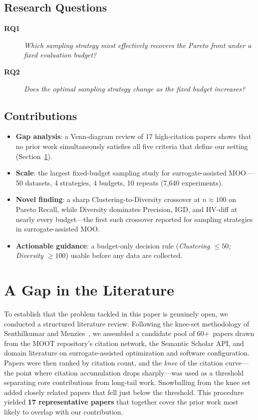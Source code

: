 \documentclass[sigconf,nonacm]{acmart}
\begin{document}
\subsection{Research Questions}

\begin{description}
  \item[\textbf{RQ1}] \textit{Which sampling strategy most effectively recovers
  the Pareto front under a fixed evaluation budget?}

  \item[\textbf{RQ2}] \textit{Does the optimal sampling strategy change as the
  fixed budget increases?}
\end{description}

\subsection{Contributions}

\begin{itemize}[leftmargin=*]
  \item \textbf{Gap analysis}: a Venn-diagram review of 17 high-citation
  papers shows that no prior work simultaneously satisfies all five criteria
  that define our setting (Section~\ref{sec:gap}).
  \item \textbf{Scale}: the largest fixed-budget sampling study for
  surrogate-assisted MOO---50 datasets, 4 strategies, 4 budgets, 10 repeats
  (7{,}640 experiments).
  \item \textbf{Novel finding}: a sharp Clustering-to-Diversity crossover at
  $n\approx 100$ on Pareto Recall, while Diversity dominates Precision, IGD,
  and HV-diff at nearly every budget---the first such crossover reported
  for sampling strategies in surrogate-assisted MOO.
  \item \textbf{Actionable guidance}: a budget-only decision rule
  (\emph{Clustering $\leq 50$; Diversity $\geq 100$}) usable before any data
  are collected.
\end{itemize}

\section{A Gap in the Literature}
\label{sec:gap}

To establish that the problem tackled in this paper is genuinely open, we
conducted a structured literature review.
Following the knee-set methodology of Senthilkumar and
Menzies~\cite{senthilkumar2025llm}, we assembled a candidate pool of
60+~papers drawn from the MOOT repository's citation network, the Semantic
Scholar API, and domain literature on surrogate-assisted optimization and
software configuration.
Papers were then ranked by citation count, and the \emph{knee} of the citation
curve---the point where citation accumulation drops sharply---was used as a
threshold separating core contributions from long-tail work.
Snowballing from the knee set added closely related papers that fell just
below the threshold.
This procedure yielded \textbf{17 representative papers} that together
cover the prior work most likely to overlap with our contribution.
\end{document}
